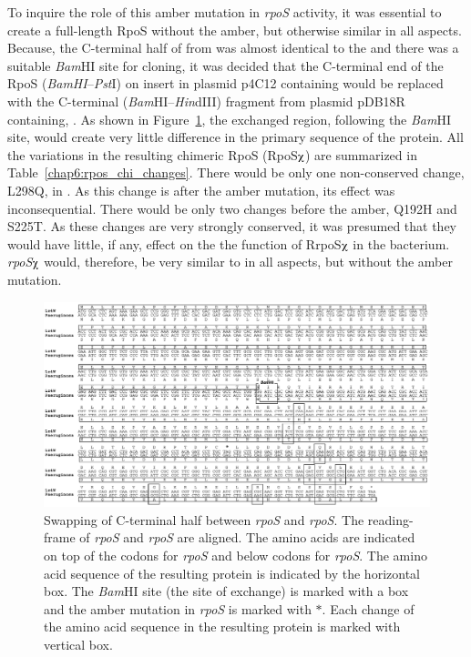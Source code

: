 To inquire the role of this amber mutation in \emph{rpoS}
activity, it was essential to create a full-length RpoS without
the amber, but otherwise similar in all aspects. Because, the
C-terminal half of \pasig{} from  was almost identical to
the \lzsig{} and there was a suitable \emph{Bam}HI site for
cloning, it was decided that the C-terminal end of the RpoS
(\emph{BamHI}--\emph{Pst}I) on insert in plasmid p4C12 containing
\lzsig{} would be replaced with the C-terminal
(\emph{Bam}HI--\emph{Hin}dIII) fragment from plasmid pDB18R
containing, \pasig{}\@. As shown in Figure~\ref{chap6:swap}, the
exchanged region, following the \emph{Bam}HI site, would create
very little difference in the primary sequence of the protein. All
the variations in the resulting chimeric RpoS (RpoS$\chiup$)  are
summarized in Table~\ref{chap6:rpos_chi_changes}. There would be
only one non-conserved change, L298Q, in \lzsig{}. As this change
is after the amber mutation, its effect was inconsequential. There
would be only two changes before the amber, Q192H and S225T\@. As
these changes are very strongly conserved, it was presumed that
they would have little, if any, effect on the the function of
RrpoS$\chiup$ in the bacterium. \emph{rpoS}$\chiup$ would,
therefore, be very similar to \lzsig{} in all aspects, but
without the amber mutation.

\begin{figure}
\centering
\includegraphics{figures/chap6_fusion_codon}
\caption[Domain swapping of Lz4W \emph{rpoS}]{Swapping of
C-terminal half between \emph{rpoS} and
\emph{rpoS}. The reading-frame of
\emph{rpoS} and \emph{rpoS} are aligned. The
amino acids are indicated on top of the codons for
\emph{rpoS} and below codons for
\emph{rpoS}. The amino acid sequence of the resulting
protein is indicated by the horizontal box. The \emph{Bam}HI site
(the site of exchange) is marked with a box and the amber mutation
in \emph{rpoS} is marked with $\ast$. Each change of
the amino acid sequence in the resulting protein is marked with
vertical box.} \label{chap6:swap}
\end{figure}

